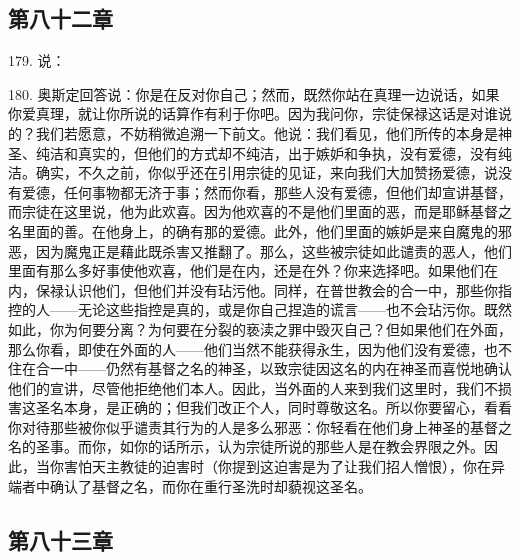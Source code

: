 
\subsection{第八十二章}

179. 说：\par

180. 奥斯定回答说：你是在反对你自己；然而，既然你站在真理一边说话，如果你爱真理，就让你所说的话算作有利于你吧。因为我问你，宗徒保禄这话是对谁说的？我们若愿意，不妨稍微追溯一下前文。他说：我们看见，他们所传的本身是神圣、纯洁和真实的，但他们的方式却不纯洁，出于嫉妒和争执，没有爱德，没有纯洁。确实，不久之前，你似乎还在引用宗徒的见证，来向我们大加赞扬爱德，说没有爱德，任何事物都无济于事；然而你看，那些人没有爱德，但他们却宣讲基督，而宗徒在这里说，他为此欢喜。因为他欢喜的不是他们里面的恶，而是耶稣基督之名里面的善。在他身上，的确有那的爱德。此外，他们里面的嫉妒是来自魔鬼的邪恶，因为魔鬼正是藉此既杀害又推翻了。那么，这些被宗徒如此谴责的恶人，他们里面有那么多好事使他欢喜，他们是在内，还是在外？你来选择吧。如果他们在内，保禄认识他们，但他们并没有玷污他。同样，在普世教会的合一中，那些你指控的人——无论这些指控是真的，或是你自己捏造的谎言——也不会玷污你。既然如此，你为何要分离？为何要在分裂的亵渎之罪中毁灭自己？但如果他们在外面，那么你看，即使在外面的人——他们当然不能获得永生，因为他们没有爱德，也不住在合一中——仍然有基督之名的神圣，以致宗徒因这名的内在神圣而喜悦地确认他们的宣讲，尽管他拒绝他们本人。因此，当外面的人来到我们这里时，我们不损害这圣名本身，是正确的；但我们改正个人，同时尊敬这名。所以你要留心，看看你对待那些被你似乎谴责其行为的人是多么邪恶：你轻看在他们身上神圣的基督之名的圣事。而你，如你的话所示，认为宗徒所说的那些人是在教会界限之外。因此，当你害怕天主教徒的迫害时（你提到这迫害是为了让我们招人憎恨），你在异端者中确认了基督之名，而你在重行圣洗时却藐视这圣名。\par


\subsection{第八十三章}

